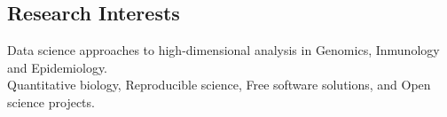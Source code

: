 \documentclass[margin,line]{res}
\begin{document}
\address{Calle Tambo Huascar 201, San Miguel, Lima - Peru}
\address{avallecam@gmail.com, @avallecam, (+51)950951722}

\begin{resume}

\vspace*{.15in}

\section{\sc Research Interests}%

Data science approaches to high-dimensional analysis in Genomics, Inmunology and Epidemiology.\\
Quantitative biology, Reproducible science, Free software solutions, and Open science projects.\\



\end{resume}
\end{document}
